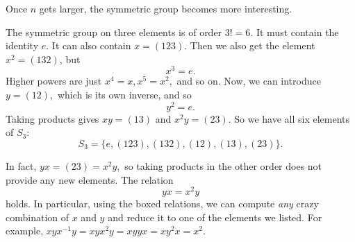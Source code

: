 Once $n$ gets larger, the symmetric group becomes more interesting.
\begin{example}[$S_3$]
The symmetric group on three elements is of order $3! = 6.$ It must contain the identity $e.$ It can also contain $x = (123).$ Then we also get the element $x^2 = (132)$, but \[\boxed{x^3 = e.}\] Higher powers are just $x^4 = x, x^5 = x^2,$ and so on. Now, we can introduce $y = (12),$ which is its own inverse, and so \[\boxed{y^2 = e}.\] Taking products gives $xy = (13)$ and $x^2y = (23).$ So we have all six elements of $S_3$:
\[
S_3 = \{e, (123), (132), (12), (13), (23)\}.
\]

In fact, $yx = (23) = x^2y,$ so taking products in the other order does not provide any new elements. The relation
\[
\boxed{yx = x^2y}
\]
holds. In particular, using the boxed relations, we can compute \emph{any} crazy combination of $x$ and $y$ and reduce it to one of the elements we listed. For example, $xyx^{-1}y = xyx^2y = xyyx = xy^2x = x^2.$
\end{example}

\newpage